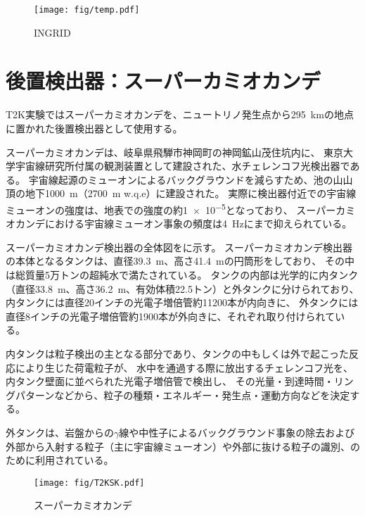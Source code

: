 \begin{figure}[htb]
\centering
\texttt{[image: fig/temp.pdf]}
\caption[INGRID]{INGRID}
\label{INGRID}
\end{figure}

\fi %


\newpage
\section{後置検出器：スーパーカミオカンデ}

T2K実験ではスーパーカミオカンデを、ニュートリノ発生点から\qty{295}{\km}の地点に置かれた後置検出器として使用する。

スーパーカミオカンデは、岐阜県飛騨市神岡町の神岡鉱山茂住坑内に、
東京大学宇宙線研究所付属の観測装置として建設された、水チェレンコフ光検出器である。
宇宙線起源のミューオンによるバックグラウンドを減らすため、池の山山頂の地下\qty{1000}{\m}（\qty{2700}{\m} w.q.e）に建設された。
実際に検出器付近での宇宙線ミューオンの強度は、地表での強度の約\num{1e-5}となっており、
スーパーカミオカンデにおける宇宙線ミューオン事象の頻度は\qty{4}{\Hz}にまで抑えられている。

スーパーカミオカンデ検出器の全体図をに示す。
スーパーカミオカンデ検出器の本体となるタンクは、直径\qty{39.3}{\m}、高さ\qty{41.4}{\m}の円筒形をしており、
その中は総質量5万トンの超純水で満たされている。
タンクの内部は光学的に内タンク（直径\qty{33.8}{\m}、高さ\qty{36.2}{\m}、有効体積22.5トン）と外タンクに分けられており、
内タンクには直径20インチの光電子増倍管約11200本が内向きに、
外タンクには直径8インチの光電子増倍管約1900本が外向きに、それぞれ取り付けられている。

内タンクは粒子検出の主となる部分であり、タンクの中もしくは外で起こった反応により生じた荷電粒子が、
水中を通過する際に放出するチェレンコフ光を、内タンク壁面に並べられた光電子増倍管で検出し、
その光量・到達時間・リングパターンなどから、粒子の種類・エネルギー・発生点・運動方向などを決定する。

外タンクは、岩盤からの$\gamma$線や中性子によるバックグラウンド事象の除去および
外部から入射する粒子（主に宇宙線ミューオン）や外部に抜ける粒子の識別、のために利用されている。

\begin{figure}[!htb]
\centering
\texttt{[image: fig/T2KSK.pdf]}
\caption[スーパーカミオカンデ]{スーパーカミオカンデ}
\label{SuperKamiokande}
\end{figure}

